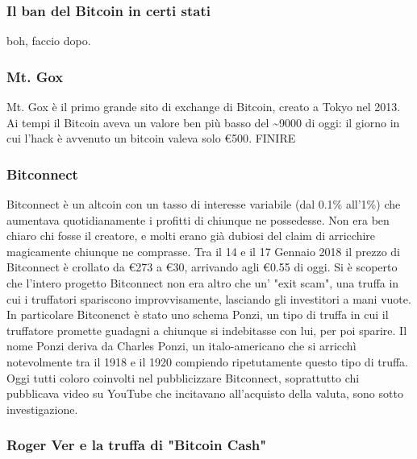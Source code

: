 \documentclass {article}
\begin{document}
\subsubsection {Il ban del Bitcoin in certi stati}


boh, faccio dopo.


\subsubsection {Mt. Gox}


Mt. Gox è il primo grande sito di exchange di Bitcoin, creato a Tokyo nel 2013.
Ai tempi il Bitcoin aveva un valore ben più basso del \textasciitilde 9000 di oggi: il giorno in cui l'hack è avvenuto un bitcoin valeva solo \euro{500}. FINIRE


\subsubsection {Bitconnect}


Bitconnect è un altcoin con un tasso di interesse variabile (dal 0.1\% all'1\%) che aumentava quotidianamente i profitti di chiunque ne possedesse.
Non era ben chiaro chi fosse il creatore, e molti erano già dubiosi del claim di arricchire magicamente chiunque ne comprasse.
Tra il 14 e il 17 Gennaio 2018 il prezzo di Bitconnect è crollato da \euro{273} a \euro{30}, arrivando agli \euro{0.55} di oggi.
Si è scoperto che l'intero progetto Bitconnect non era altro che un' "exit scam", una truffa in cui i truffatori spariscono improvvisamente, lasciando gli investitori a mani vuote.
In particolare Bitconenct è stato uno schema Ponzi, un tipo di truffa in cui il truffatore promette guadagni a chiunque si indebitasse con lui, per poi sparire.
Il nome Ponzi deriva da Charles Ponzi, un italo-americano che si arricchì notevolmente tra il 1918 e il 1920 compiendo ripetutamente questo tipo di truffa.
Oggi tutti coloro coinvolti nel pubblicizzare Bitconnect, soprattutto chi pubblicava video su YouTube che incitavano all'acquisto della valuta, sono sotto investigazione.


\subsubsection {Roger Ver e la truffa di "Bitcoin Cash"}
\end{document}
